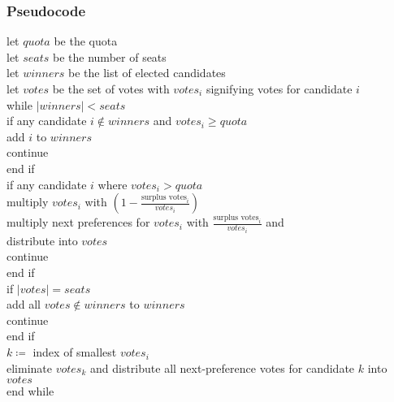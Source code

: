 \documentclass[12pt]{article}
\begin{document}
\subsubsection{Pseudocode}
\label{alg:stv psuedocode}
let $quota$ be the quota \\
let $seats$ be the number of seats \\
let $winners$ be the list of elected candidates \\
let $votes$ be the set of votes with $votes_{i}$ signifying votes for candidate $i$\\
while $\left\vert{winners}\right\vert < seats$\\
\tab if any candidate $i \notin winners$ and $votes_{i} \geq quota$ \\
\tab\tab add $i$ to $winners$ \\
\tab\tab continue \\
\tab end if \\
\tab if any candidate $i$ where $votes_{i} > quota$\\
\tab\tab multiply $votes_{i}$ with $(1 - \frac{\text{surplus votes}_{i}}{votes_{i}})$ \\
\tab\tab multiply next preferences for $votes_{i}$ with $\frac{\text{surplus votes}_{i}}{votes_{i}}$ and \\ \tab\tab distribute into $votes$\\
\tab\tab continue \\
\tab end if \\
\tab if $\left\vert{votes}\right\vert = seats$ \\
\tab\tab add all $votes \notin winners$ to $winners$ \\
\tab\tab continue \\
\tab end if \\
\tab $k \coloneqq$ index of smallest $votes_{i}$ \\
\tab eliminate $votes_{k}$ and distribute all next-preference votes for candidate $k$ \tab into $votes$\\
end while
\end{document}
